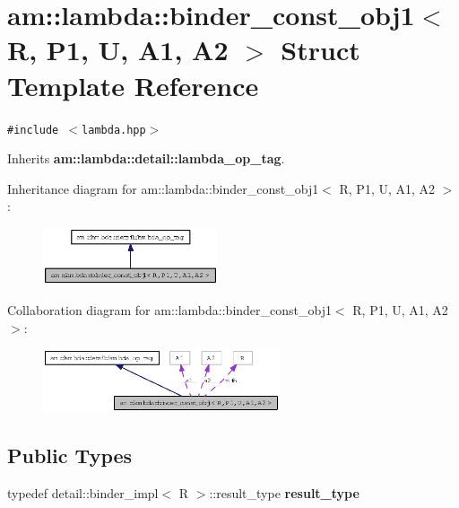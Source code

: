 \section{am::lambda::binder\_\-const\_\-obj1$<$ R, P1, U, A1, A2 $>$ Struct Template Reference}
\label{structam_1_1lambda_1_1binder__const__obj1}
{\tt \#include $<$lambda.hpp$>$}

Inherits {\bf am::lambda::detail::lambda\_\-op\_\-tag}.

Inheritance diagram for am::lambda::binder\_\-const\_\-obj1$<$ R, P1, U, A1, A2 $>$:\begin{figure}[H]
\begin{center}
\leavevmode
\includegraphics[width=146pt]{structam_1_1lambda_1_1binder__const__obj1__inherit__graph}
\end{center}
\end{figure}
Collaboration diagram for am::lambda::binder\_\-const\_\-obj1$<$ R, P1, U, A1, A2 $>$:\begin{figure}[H]
\begin{center}
\leavevmode
\includegraphics[width=198pt]{structam_1_1lambda_1_1binder__const__obj1__coll__graph}
\end{center}
\end{figure}
\subsection*{Public Types}
\begin{CompactItemize}
\item 
typedef detail::binder\_\-impl$<$ R $>$::result\_\-type \textbf{result\_\-type}\label{structam_1_1lambda_1_1binder__const__obj1_2e28710b27809b1164ec8049296c83b1}

\end{CompactItemize}
